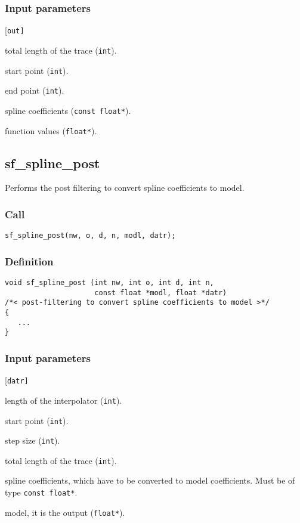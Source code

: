 \subsubsection*{Input parameters}
\begin{desclist}{\tt }{\quad}[\tt out]
   \setlength\itemsep{0pt}
   \item[n]   total length of the trace (\texttt{int}). 
   \item[n1]  start point (\texttt{int}).  
   \item[n2]  end point (\texttt{int}). 
   \item[inp] spline coefficients (\texttt{const float*}).
   \item[out] function values (\texttt{float*}).
\end{desclist}




\subsection{{sf\_spline\_post}}
Performs the post filtering to convert spline coefficients to model.


\subsubsection*{Call}
\begin{verbatim}sf_spline_post(nw, o, d, n, modl, datr);\end{verbatim}

\subsubsection*{Definition}
\begin{verbatim}
void sf_spline_post (int nw, int o, int d, int n, 
                     const float *modl, float *datr)
/*< post-filtering to convert spline coefficients to model >*/
{
   ...
}
\end{verbatim}

\subsubsection*{Input parameters}
\begin{desclist}{\tt }{\quad}[\tt datr]
   \setlength\itemsep{0pt}
   \item[nw]   length of the interpolator (\texttt{int}). 
   \item[o]    start point (\texttt{int}).  
   \item[d]    step size (\texttt{int}). 
   \item[n]    total length of the trace (\texttt{int}). 
   \item[modl] spline coefficients, which have to be converted to model coefficients.  Must be of type \texttt{const float*}.
   \item[datr] model, it is the output (\texttt{float*}).
\end{desclist}




